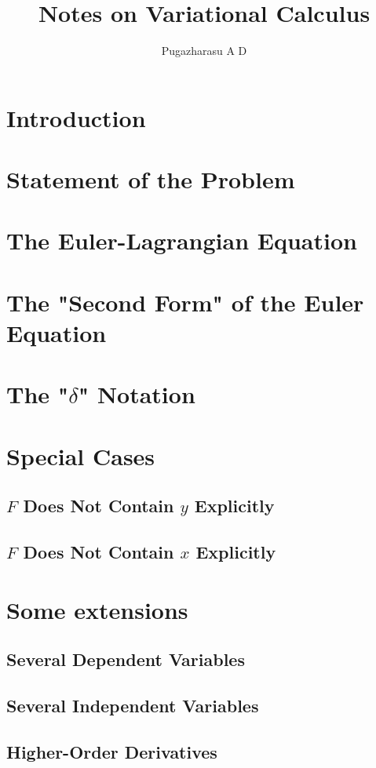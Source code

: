 \documentclass[]{article}
\title{Notes on Variational Calculus}
\author{Pugazharasu A D}
\begin{document}
\maketitle

\begin{abstract}

\end{abstract}

\section{Introduction}
\section{Statement of the Problem}
\section{The Euler-Lagrangian Equation}
\section{The "Second Form" of the Euler Equation}
\section{The "$\delta$" Notation}
\section{Special Cases}
\subsection{$F$ Does Not Contain $y$ Explicitly}
\subsection{$F$ Does Not Contain $x$ Explicitly}
\section{Some extensions}
\subsection{Several Dependent Variables}
\subsection{Several Independent Variables}
\subsection{Higher-Order Derivatives}
\end{document}

